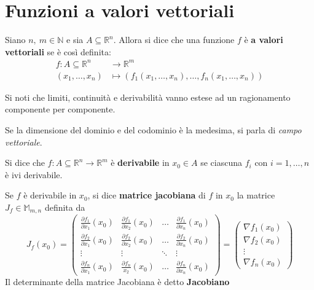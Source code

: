 \section{Funzioni a valori vettoriali}
\begin{definition} \label{Def: Funzioni a valori vettoriali}
    Siano $n,\ m \in \mathbb{N}$ e sia $A \subseteq \mathbb{R}^n$. Allora si dice che una funzione $f$ è \textbf{a valori vettoriali} se è così definita:
    \begin{equation}
    \begin{aligned}
        f:A \subseteq \mathbb{R}^n &\to \mathbb{R}^m\\
        (x_1, \dots, x_n) &\mapsto (f_1(x_1, \dots, x_n), \dots, f_n(x_1, \dots, x_n))
    \end{aligned}
    \end{equation}
\end{definition}
\begin{oss}
    Si noti che limiti, continuità e derivabilità vanno estese ad un ragionamento componente per componente.
\end{oss}
\begin{oss}
    Se la dimensione del dominio e del codominio è la medesima, si parla di \textit{campo vettoriale}.
\end{oss}
\begin{definition} \label{Def: Derivabilità di f. vettoriali}
    Si dice che $f:A \subseteq \mathbb{R}^n \to \mathbb{R}^m$ è \textbf{derivabile} in $x_0 \in A$ se ciascuna $f_i$ con $i=1, \dots, n$ è ivi derivabile.
\end{definition}
\begin{definition} \label{Def: Matrice Jacobiana}
    Se $f$ è derivabile in $x_0$, si dice \textbf{matrice jacobiana} di $f$ in $x_0$ la matrice $J_f \in \mathbb{M}_{m,n}$ definita da
    \begin{equation} \label{Eq: Matrice Jacobiana}
        J_f(x_0)=\begin{pmatrix}
            \frac{\partial{f_1}}{\partial{x_1}}(x_0) & \frac{\partial{f_1}}{\partial{x_2}}(x_0)& \dots & \frac{\partial{f_1}}{\partial{x_n}}(x_0)\\
            \frac{\partial{f_2}}{\partial{x_1}}(x_0)& \frac{\partial{f_2}}{\partial{x_2}}(x_0)& \dots & \frac{\partial{f_2}}{\partial{x_n}}(x_0)\\
            \vdots & \vdots & \ddots & \vdots\\
            \frac{\partial{f_n}}{\partial{x_1}}(x_0) & \frac{\partial{f_n}}{x_2}(x_0)& \dots & \frac{\partial{f_n}}{\partial{x_n}}(x_0)
        \end{pmatrix}
        =
        \begin{pmatrix}
            \nabla f_1 (x_0)\\
            \nabla f_2(x_0)\\
            \vdots\\
            \nabla f_n(x_0)
        \end{pmatrix}
    \end{equation}
    Il determinante della matrice Jacobiana è detto \textbf{Jacobiano} \label{Def: Jacobiano}
\end{definition}
